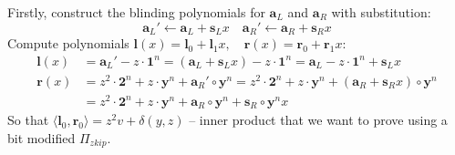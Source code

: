 \documentclass[../lecture-notes-148x210.tex]{subfiles}
\begin{document}
Firstly, construct the blinding polynomials for $\mathbf{a}_L$ and $\mathbf{a}_R$ with substitution:
$$\mathbf{a}_L' \gets \mathbf{a}_L + \mathbf{s}_L x \quad \mathbf{a}_R' \gets \mathbf{a}_R + \mathbf{s}_R x$$
Compute polynomials $\mathbf{l}(x) = \mathbf{l}_0 + \mathbf{l}_1 x, \quad \mathbf{r}(x) = \mathbf{r}_0 + \mathbf{r}_1 x$:
\begin{align*}
    \mathbf{l}(x) &= \mathbf{a}_L' - z \cdot \mathbf{1}^n = (\mathbf{a}_L + \mathbf{s}_L x) - z \cdot \mathbf{1}^n = \mathbf{a}_L - z \cdot \mathbf{1}^n + \mathbf{s}_L x\\
    \mathbf{r}(x) &= z^2 \cdot \mathbf{2}^n + z \cdot \mathbf{y}^n + \mathbf{a}_R' \circ \mathbf{y}^n = z^2 \cdot \mathbf{2}^n + z \cdot \mathbf{y}^n + (\mathbf{a}_R + \mathbf{s}_R x) \circ \mathbf{y}^n \\
    & = z^2 \cdot \mathbf{2}^n + z \cdot \mathbf{y}^n + \mathbf{a}_R \circ \mathbf{y}^n + \mathbf{s}_R \circ \mathbf{y}^n x
\end{align*}
So that $\langle \mathbf{l}_0, \mathbf{r}_0 \rangle = z^2v + \delta(y,z)$ -- inner product that we want to prove using a bit modified $\Pi_{zkip}$. 
\end{document}
